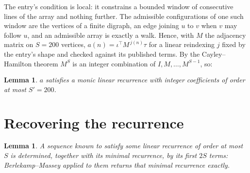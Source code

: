 \documentclass[11pt,a4paper]{article}
\theoremstyle{plain}
\newtheorem{lemma}[theorem]{Lemma}
\theoremstyle{definition}
\begin{document}
The entry's condition is local: it constrains a bounded window of consecutive lines of the
array and nothing further. The admissible configurations of one such window are the vertices
of a finite digraph, an edge joining $u$ to $v$ when $v$ may follow $u$, and an admissible
array is exactly a walk. Hence, with $M$ the adjacency matrix on $S=200$ vertices,
$a(n)=\iota^{\!\top}M^{\,j(n)}\tau$ for a linear reindexing $j$ fixed by the entry's shape
and checked against its published terms. By the Cayley--Hamilton theorem $M^{S}$ is an
integer combination of $I,M,\dots,M^{S-1}$, so:

\begin{lemma}\label{lem:cf}
$a$ satisfies a monic linear recurrence with integer coefficients of order at most
$S'=200$.
\end{lemma}

\section{Recovering the recurrence}

\begin{lemma}\label{lem:bm}
A sequence known to satisfy some linear recurrence of order at most $S$ is determined, together
with its minimal recurrence, by its first $2S$ terms: Berlekamp--Massey applied to them returns
that minimal recurrence exactly.
\end{lemma}
\end{document}
